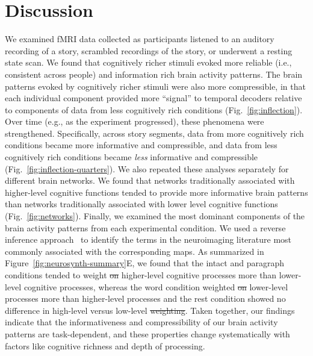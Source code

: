 \documentclass[english, 11pt]{article}
\providecommand{\DIFaddtex}[1]{{\protect\color{blue}\uwave{#1}}} %
\providecommand{\DIFdeltex}[1]{{\protect\color{red}\sout{#1}}}                      %
\providecommand{\DIFaddbegin}{} %
\providecommand{\DIFaddend}{} %
\providecommand{\DIFdelbegin}{} %
\providecommand{\DIFdelend}{} %
\providecommand{\DIFadd}[1]{\texorpdfstring{\DIFaddtex{#1}}{#1}} %
\providecommand{\DIFdel}[1]{\texorpdfstring{\DIFdeltex{#1}}{}} %
\newcommand{\DIFscaledelfig}{0.5}
\newlength{\DIFdelgraphicswidth} %
\newlength{\DIFdelgraphicsheight} %
\newcommand{\DIFaddincludegraphics}[2][]{{\color{blue}\fbox{\DIFOincludegraphics[#1]{#2}}}} %
\newcommand{\DIFdelincludegraphics}[2][]{%
\sbox{\DIFdelgraphicsbox}{\DIFOincludegraphics[#1]{#2}}%
\settoboxwidth{\DIFdelgraphicswidth}{\DIFdelgraphicsbox} %
\settoboxtotalheight{\DIFdelgraphicsheight}{\DIFdelgraphicsbox} %
\scalebox{\DIFscaledelfig}{%
\parbox[b]{\DIFdelgraphicswidth}{\usebox{\DIFdelgraphicsbox}\\[-\baselineskip] \rule{\DIFdelgraphicswidth}{0em}}\llap{\resizebox{\DIFdelgraphicswidth}{\DIFdelgraphicsheight}{%
\setlength{\unitlength}{\DIFdelgraphicswidth}%
\begin{picture}(1,1)%
\thicklines\linethickness{2pt} %
{\color[rgb]{1,0,0}\put(0,0){\framebox(1,1){}}}%
{\color[rgb]{1,0,0}\put(0,0){\line( 1,1){1}}}%
{\color[rgb]{1,0,0}\put(0,1){\line(1,-1){1}}}%
\end{picture}%
}\hspace*{3pt}}} %
} %
\DeclareRobustCommand{\DIFaddbegin}{\DIFOaddbegin \let\includegraphics\DIFaddincludegraphics} %
\DeclareRobustCommand{\DIFaddend}{\DIFOaddend \let\includegraphics\DIFOincludegraphics} %
\DeclareRobustCommand{\DIFdelbegin}{\DIFOdelbegin \let\includegraphics\DIFdelincludegraphics} %
\DeclareRobustCommand{\DIFdelend}{\DIFOaddend \let\includegraphics\DIFOincludegraphics} %
\begin{document}
\section*{Discussion}

We examined fMRI data collected as participants listened to an auditory
recording of a story, scrambled recordings of the story, or underwent a resting
state scan. We found that cognitively richer stimuli evoked more reliable
(i.e., consistent across people) and information rich brain activity patterns.
The brain patterns evoked by cognitively richer stimuli were also more
compressible, in that each individual component provided more ``signal'' to
temporal decoders relative to components of data from less cognitively rich
conditions (Fig.~\ref{fig:inflection}). Over time (e.g., as the experiment
progressed), these phenomena were strengthened. Specifically, across story
segments, data from more cognitively rich conditions became more informative
and compressible, and data from less cognitively rich conditions became
\textit{less} informative and compressible
(Fig.~\ref{fig:inflection-quarters}).  We also repeated these analyses
separately for different brain networks. We found that networks traditionally
associated with higher-level cognitive functions tended to provide more
informative brain patterns than networks traditionally associated with lower
level cognitive functions (Fig.~\ref{fig:networks}). Finally, we examined the
most dominant components of the brain activity patterns from each experimental
condition. We used a reverse inference approach~\citep{RubiEtal17} to identify
the terms in the neuroimaging literature most commonly associated with the
corresponding maps. As summarized in Figure~\ref{fig:neurosynth-summary}E, we
found that the intact and paragraph conditions tended to weight \DIFdelbegin \DIFdel{on }\DIFdelend higher-level
cognitive processes more than lower-level cognitive processes, whereas the word
condition weighted \DIFdelbegin \DIFdel{on }\DIFdelend lower-level processes more than higher-level processes
and the rest condition showed no \DIFaddbegin \DIFadd{reliable }\DIFaddend difference in high-level versus low-level
\DIFdelbegin \DIFdel{weighting}\DIFdelend \DIFaddbegin \DIFadd{weightings}\DIFaddend . Taken together, our findings indicate that the informativeness and
compressibility of our brain activity patterns are task-dependent, and these
properties change systematically with factors like cognitive richness and depth
of processing.
\end{document}
